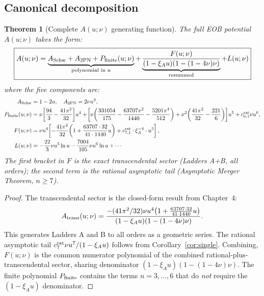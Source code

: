 \documentclass[11pt,a4paper]{article}
\theoremstyle{plain}
\newtheorem{theorem}{Theorem}[section]
\theoremstyle{definition}
\theoremstyle{remark}
\newcommand{\xiA}{\xi_A}
\begin{document}
\subsection{Canonical decomposition}

\begin{theorem}[Complete $A(u;\nu)$ generating function]\label{thm:complete_A}
The full EOB potential $A(u;\nu)$ takes the form:
\begin{equation}
  \boxed{A(u;\nu) = \underbrace{A_{\rm Schw} + A_{\rm 2PN} + P_{\rm finite}(u;\nu)}_{\text{polynomial in }u}
    + \underbrace{\frac{F(u;\nu)}{(1-\xiA u)(1-(1-4\nu)\nu)}}_{\text{resummed}} + L(u;\nu)}
  \label{eq:A_complete}
\end{equation}
where the five components are:
\begin{align}
  A_{\rm Schw} &= 1 - 2u,\quad A_{\rm 2PN} = 2\nu u^3, \label{eq:A_Schw_2PN}\\
  P_{\rm finite}(u;\nu) &= \nu\!\left[\frac{94}{3} - \frac{41\pi^2}{32}\right]\!u^4
    + \!\left[\nu\!\left(\frac{331054}{175} - \frac{63707\pi^2}{1440}
    - \frac{5201\pi^4}{512}\right)
    + \nu^2\!\left(\frac{41\pi^2}{32} - \frac{221}{6}\right)\right]\!u^5
    + c_{6,1}^{\rm rat}\nu u^6, \label{eq:P_finite}\\
  F(u;\nu) &= \nu u^4\!\left[-\frac{41\pi^2}{32}\!\left(1 + \frac{63707\cdot32}{41\cdot1440}u\right)
    + c_{7,1}^{\rm rat}\cdot\xiA^{-4}\cdot u^3\right], \label{eq:F_poly}\\
  L(u;\nu) &= -\frac{22}{3}\nu u^5\ln u - \frac{7004}{105}\nu u^6\ln u + \cdots
  \label{eq:L_logs}
\end{align}
The first bracket in $F$ is the exact transcendental sector (Ladders A+B, all orders);
the second term is the rational asymptotic tail (Asymptotic Merger Theorem, $n\geq7$).
\end{theorem}

\begin{proof}
The transcendental sector is the closed-form result from Chapter~4:
\begin{equation}
  A_{\rm trans}(u;\nu) = \frac{-(41\pi^2/32)\nu u^4\!\left(1 + \tfrac{63707\cdot32}{41\cdot1440}u\right)}
    {(1-\xiA u)(1-(1-4\nu)\nu)}.
\end{equation}
This generates Ladders A and B to all orders as a geometric series.  The rational
asymptotic tail $c_{7}^{\rm rat}\nu u^7/(1-\xiA u)$ follows from
Corollary~\ref{cor:single}.  Combining, $F(u;\nu)$ is the common numerator
polynomial of the combined rational-plus-transcendental sector, sharing denominator
$(1-\xiA u)(1-(1-4\nu)\nu)$.  The finite polynomial $P_{\rm finite}$ contains
the terms $n=3,\ldots,6$ that do \emph{not} require the $(1-\xiA u)$ denominator.
\end{proof}
\end{document}
